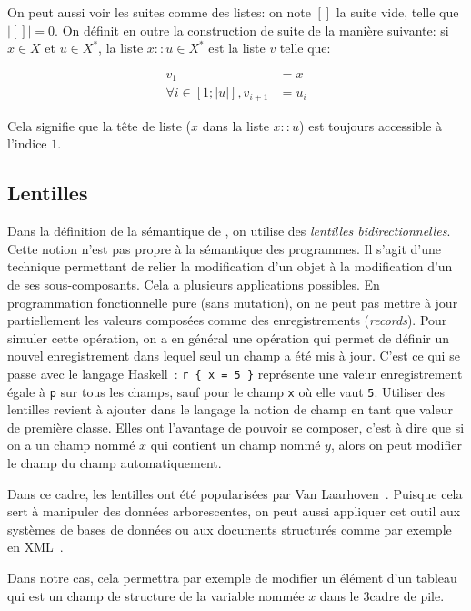 On peut aussi voir les suites comme des listes: on note $[]$ la suite vide,
telle que $|[]| = 0$. On définit en outre la construction de suite de la manière
suivante: si $x ∈ X$ et $u ∈ X^*$, la liste $x::u ∈ X^*$ est la liste $v$ telle
que:

\begin{align*}
                       v_1 & = x \\
  ∀ i ∈ [1; |u|] , v_{i+1} & = u_i
\end{align*}

Cela signifie que la tête de liste ($x$ dans la liste $x :: u$) est toujours
accessible à l'indice $1$.

\subsection*{Lentilles}

Dans la définition de la sémantique de \langname, on utilise des \emph{lentilles
bidirectionnelles}. Cette notion n'est pas propre à la sémantique des
programmes. Il s'agit d'une technique permettant de relier la modification d'un
objet à la modification d'un de ses sous-composants. Cela a plusieurs
applications possibles. En programmation fonctionnelle pure (sans mutation), on
ne peut pas mettre à jour partiellement les valeurs composées comme des
enregistrements (\emph{records}). Pour simuler cette opération, on a en général
une opération qui permet de définir un nouvel enregistrement dans lequel seul un
champ a été mis à jour. C'est ce qui se passe avec le langage
Haskell~: \texttt{r \{ x = 5 \}} représente une valeur
enregistrement égale à \texttt{p} sur tous les champs, sauf pour le champ
\texttt{x} où elle vaut \texttt{5}. Utiliser des lentilles revient à ajouter
dans le langage la notion de champ en tant que valeur de première classe. Elles
ont l'avantage de pouvoir se composer, c'est à dire que si on a un champ nommé
$x$ qui contient un champ nommé $y$, alors on peut modifier le champ du champ
automatiquement.

Dans ce cadre, les lentilles ont été popularisées par Van
Laarhoven~\cite{LaarhovenLenses}. Puisque cela sert à manipuler des données
arborescentes, on peut aussi appliquer cet outil aux systèmes de bases de
données ou aux documents structurés comme par exemple en
XML~\cite{PierceLenses}.

Dans notre cas, cela permettra par exemple de modifier un élément d'un tableau
qui est un champ de structure de la variable nommée $x$ dans le 3\ieme cadre de
pile.

